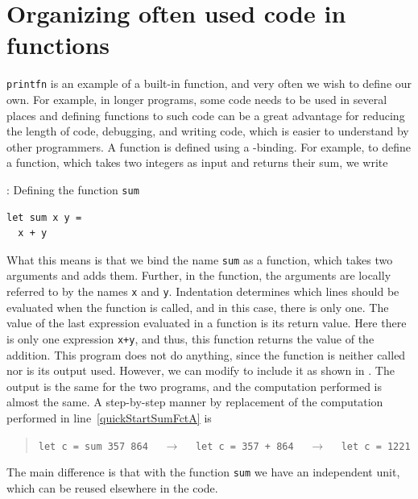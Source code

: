 \documentclass[springer.tex]{subfiles}
\begin{document}
\section{Organizing often used code in functions}
\lstinline{printfn} is an example of a built-in function, and very often we wish to define our own. For example, in longer programs, some code needs to be used in several places and defining functions to  such code can be a great advantage for reducing the length of code, debugging, and writing code, which is easier to understand by other programmers. A function is defined using a -binding. For example, to define a function, which takes two integers as input and returns their sum, we write
%
\begin{codeNOutput}[label=sumFunction,
  top=-5pt,
  bottom=-5pt,
  left=-2pt,
  right=-2pt,
]{: Defining the function \lstinline{sum}}
\begin{lstlisting}
let sum x y =
  x + y
\end{lstlisting} 
\end{codeNOutput}
%
What this means is that we bind the name \lstinline{sum} as a function, which takes two arguments and adds them. Further, in the function, the arguments are locally referred to by the names \lstinline{x} and \lstinline{y}. Indentation determines which lines should be evaluated when the function is called, and in this case, there is only one. The value of the last expression evaluated in a function is its return value. Here there is only one expression \lstinline{x+y}, and thus, this function returns the value of the addition. This program does not do anything, since the function is neither called nor is its output used. However, we can modify  to include it as shown in .
% 
%
The output is the same for the two programs, and the computation performed is almost the same. A step-by-step manner by replacement of the computation performed in line~\ref{quickStartSumFctA} is
\begin{quote}
  \lstinline{let c = sum 357 864} $\quad\rightarrow\quad$  \lstinline{let c = 357 + 864}  $\quad\rightarrow\quad$  \lstinline{let c = 1221}
\end{quote}
The main difference is that with the function \lstinline{sum} we have an independent unit, which can be reused elsewhere in the code.
\end{document}
